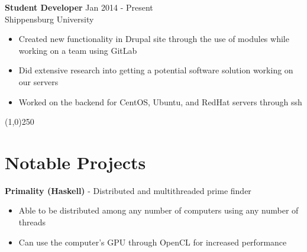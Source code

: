 \documentclass[margin,line, 11pt]{resume}
\begin{document}
\begin{resume}
    \textbf{Student Developer} 	\hfill Jan 2014 - Present \vspace{1.5mm}\\
    Shippensburg University 
    \begin{itemize}

	\item Created new functionality in Drupal site through the use of modules while working on a team using GitLab

	\item Did extensive research into getting a potential software solution working on our servers
	\item Worked on the backend for CentOS, Ubuntu, and RedHat servers through ssh

    \end{itemize}
    
    \vspace{-5mm}
    \line(1,0){250}
    \vspace{-4mm}
    
    

    
    \section{\mysidestyle \textbf {Notable Projects}}
    
    \vspace{0mm}

     \textbf{Primality (Haskell)} - Distributed and multithreaded prime finder
     \begin{itemize}
      \item Able to be distributed among any number of computers using any number of threads
      \item Can use the computer's GPU through OpenCL for increased performance
     \end{itemize}


\end{resume}
\end{document}

